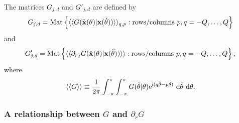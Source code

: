 \documentclass[12pt,a4paper]{article}
\newcommand{\bx}{{\bf x}}
\newcommand{\bxo}{\check{\textbf{x}}}
\newcommand{\tho}{\check{\theta}}
\begin{document}
The matrices $G_{j,d}$ and $G'_{j,d}$ are defined by
\begin{equation}
G_{j,d}
=
\mat
\left\{
\langle\langle
G(\bxo(\theta)\vert\bx(\tho))
\rangle\rangle_{q,p}
:
\text{rows/columns }
p,q=-Q,\dots,Q
\right\}
\end{equation}
and
\begin{equation}
G_{j,d}'
=
\mat
\left\{
\langle\langle
\partial_{r_{d}}
G(\bxo(\theta)\vert\bx(\tho))
\rangle\rangle
:
\text{rows/columns }
p,q=-Q,\dots,Q
\right\},
\end{equation}
where
\begin{equation}
\langle\langle
G
\rangle\rangle
\equiv
\frac{1}{2\pi}
\int_{-\pi}^{\pi}
\int_{-\pi}^{\pi}
G(\tho\vert \theta)
\exp^{\ci(q\tho -p\theta)}
\wrt\tho\wrt\theta.
\end{equation}


%

\subsubsection{A relationship between $G$ and $\partial_{r}G$}
\end{document}
